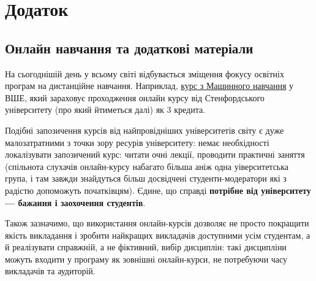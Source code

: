 \documentclass[14pt, a4paper]{extarticle}  %
\begin{document}
\newpage\section{Додаток}

\subsection{Онлайн навчання та додаткові матеріали}
\label{Additional materials}
На сьогоднішій день у всьому світі відбувається зміщення фокусу освітніх програм на дистанційне навчання. Наприклад, \href{https://www.hse.ru/ba/am/courses/219906616.html}{курс з Машинного навчання} у ВШЕ, який зараховує проходження онлайн курсу від Стенфордського університету (про який йтиметься далі) як 3 кредита.

Подібні запозичення курсів від найпровідніших університетів світу є дуже малозатратними з точки зору ресурів університету: немає необхідності локалізувати запозичений курс: читати очні лекції, проводити практичні заняття (спільнота слухачів онлайн-курсу набагато більша аніж одна уіверситетська група, і там завжди знайдуться більш досвідчені студенти-модератори які з радістю допоможуть початківцям). Єдине, що справді \textbf{потрібне від університету --- бажання і заохочення студентів}.

Також зазначимо, що використання онлайн-курсів дозволяє не просто покращити якість викладання і зробити найкращих викладачів доступними усім студентам, а й реалізувати справжній, а не фіктивний, вибір дисциплін: такі дисципліни можуть входити у програму як зовнішні онлайн-курси, не потребуючи часу викладачів та аудиторій. 
\end{document}
